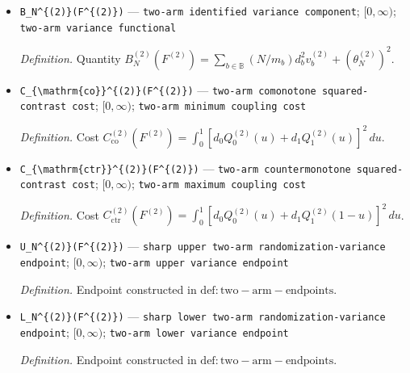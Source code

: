 \documentclass{article}
\begin{document}
\begin{itemize}
  \par\smallskip\noindent\emph{Definition.} Countermonotone covariance \(\underline S_{10}^{(2)}=\frac{N}{N-1}[\int_0^1Q_1^{(2)}(u)Q_0^{(2)}(1-u)\,du-\mu_1^{(2)}\mu_0^{(2)}]\).
  \item \texttt{B\_\allowbreak{}N\textasciicircum{}\{(2)\}\allowbreak{}(F\textasciicircum{}\{(2)\}\allowbreak{})} --- \texttt{two-\allowbreak{}arm identified variance component}; \([0,\infty)\); \texttt{two-\allowbreak{}arm variance functional}
  \par\smallskip\noindent\emph{Definition.} Quantity \(B_N^{(2)}(F^{(2)})=\sum_{b\in\mathbb B}(N/m_b)d_b^2v_b^{(2)}+(\theta_N^{(2)})^2\).
  \item \texttt{C\_\allowbreak{}\{\textbackslash{}\allowbreak{}mathrm\{co\}\allowbreak{}\}\allowbreak{}\textasciicircum{}\{(2)\}\allowbreak{}(F\textasciicircum{}\{(2)\}\allowbreak{})} --- \texttt{two-\allowbreak{}arm comonotone squared-\allowbreak{}contrast cost}; \([0,\infty)\); \texttt{two-\allowbreak{}arm minimum coupling cost}
  \par\smallskip\noindent\emph{Definition.} Cost \(C_{\mathrm{co}}^{(2)}(F^{(2)})=\int_0^1[d_0Q_0^{(2)}(u)+d_1Q_1^{(2)}(u)]^2\,du\).
  \item \texttt{C\_\allowbreak{}\{\textbackslash{}\allowbreak{}mathrm\{ctr\}\allowbreak{}\}\allowbreak{}\textasciicircum{}\{(2)\}\allowbreak{}(F\textasciicircum{}\{(2)\}\allowbreak{})} --- \texttt{two-\allowbreak{}arm countermonotone squared-\allowbreak{}contrast cost}; \([0,\infty)\); \texttt{two-\allowbreak{}arm maximum coupling cost}
  \par\smallskip\noindent\emph{Definition.} Cost \(C_{\mathrm{ctr}}^{(2)}(F^{(2)})=\int_0^1[d_0Q_0^{(2)}(u)+d_1Q_1^{(2)}(1-u)]^2\,du\).
  \item \texttt{U\_\allowbreak{}N\textasciicircum{}\{(2)\}\allowbreak{}(F\textasciicircum{}\{(2)\}\allowbreak{})} --- \texttt{sharp upper two-\allowbreak{}arm randomization-\allowbreak{}variance endpoint}; \([0,\infty)\); \texttt{two-\allowbreak{}arm upper variance endpoint}
  \par\smallskip\noindent\emph{Definition.} Endpoint constructed in \(\mathrm{def:two-arm-endpoints}\).
  \item \texttt{L\_\allowbreak{}N\textasciicircum{}\{(2)\}\allowbreak{}(F\textasciicircum{}\{(2)\}\allowbreak{})} --- \texttt{sharp lower two-\allowbreak{}arm randomization-\allowbreak{}variance endpoint}; \([0,\infty)\); \texttt{two-\allowbreak{}arm lower variance endpoint}
  \par\smallskip\noindent\emph{Definition.} Endpoint constructed in \(\mathrm{def:two-arm-endpoints}\).

\end{itemize}
\end{document}
